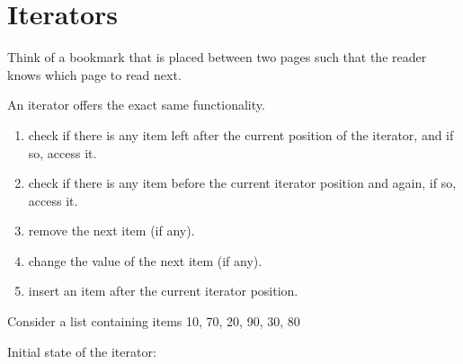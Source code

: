 \section{Iterators}

Think of a bookmark that is placed between two pages such that the reader knows which page to read next.

An iterator offers the exact same functionality. 

\begin{enumerate}
  \item check if there is any item left after the current position of the iterator, and if so, access it. 
  \item check if there is any item before the current iterator position and again, if so, access it. 
  \item remove the next item (if any).
  \item change the value of the next item (if any).
  \item insert an item after the current iterator position.
\end{enumerate}

\vskip 1mm

Consider a list containing items 10, 70, 20, 90, 30, 80
\vskip 1mm


\newpage

Initial state of the iterator:
\vskip 1mm


\vskip 1mm

